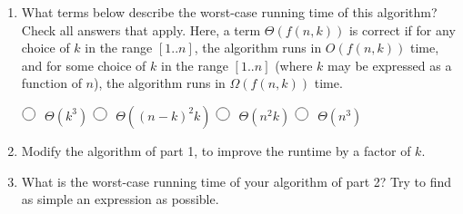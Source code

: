 \documentclass[11pt]{article}
\newcommand{\fillinMC}[1]{\fillinMCmath{\mbox{#1}}}
\newcommand{\fillinMCmath}[1]{\begin{tikzpicture}\draw circle [radius=0.5em];\end{tikzpicture}\ #1}
\begin{document}
\begin{enumerate}
\item What terms below describe the worst-case running time of this
algorithm?  Check all answers that apply.  Here, a term
$\Theta(f(n,k))$ is correct if for any choice of $k$ in the range
$[1..n]$, the algorithm runs in $O(f(n,k))$ time, and for some
choice of $k$ in the range $[1..n]$ (where $k$ may be expressed as
a function of $n$), the algorithm runs in $\Omega(f(n,k))$ time.

$\fillinMC{}$ $\Theta(k^3)$ \hspace{.6in} 
$\fillinMC{}$ $\Theta((n-k)^2 k)$   \hspace{.6in} 
$\fillinMC{}$ $\Theta(n^2 k)$   \hspace{.6in} 
$\fillinMC{}$ $\Theta(n^3)$

\item Modify the algorithm of part 1, to improve the runtime by a factor of $k$.

\item What is the worst-case running time of your algorithm of part 2?
Try to find as simple an expression as possible.
\end{enumerate}
\end{document}
